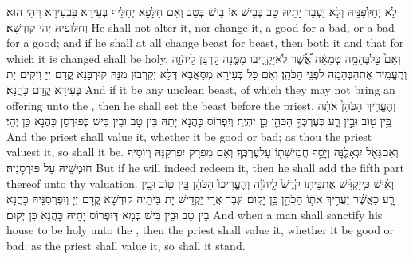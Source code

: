 {לָא יְחַלְּפִנֵּיהּ וְלָא יַעְבַּר יָתֵיהּ טָב בְּבִישׁ אוֹ בִישׁ בְּטָב וְאִם חַלָּפָא יְחַלֵּיף בְּעִירָא בִּבְעִירָא וִיהֵי הוּא וְחִלּוּפֵיהּ יְהֵי קוּדְשָׁא׃}
{He shall not alter it, nor change it, a good for a bad, or a bad for a good; and if he shall at all change beast for beast, then both it and that for which it is changed shall be holy.}{}
{וְאִם֙ כׇּל\maqqaf בְּהֵמָ֣ה טְמֵאָ֔ה אֲ֠שֶׁ֠ר לֹא\maqqaf יַקְרִ֧יבוּ מִמֶּ֛נָּה קׇרְבָּ֖ן לַֽיהֹוָ֑ה וְהֶֽעֱמִ֥יד אֶת\maqqaf הַבְּהֵמָ֖ה לִפְנֵ֥י הַכֹּהֵֽן׃}
{וְאִם כָּל בְּעִירָא מְסָאֲבָא דְּלָא יְקָרְבוּן מִנַּהּ קוּרְבָּנָא קֳדָם יְיָ וִיקִים יָת בְּעִירָא קֳדָם כָּהֲנָא׃}
{And if it be any unclean beast, of which they may not bring an offering unto the \lord, then he shall set the beast before the priest.}{}
{וְהֶעֱרִ֤יךְ הַכֹּהֵן֙ אֹתָ֔הּ בֵּ֥ין ט֖וֹב וּבֵ֣ין רָ֑ע כְּעֶרְכְּךָ֥ הַכֹּהֵ֖ן כֵּ֥ן יִהְיֶֽה׃}
{וְיִפְרוֹס כָּהֲנָא יָתַהּ בֵּין טָב וּבֵין בִּישׁ כְּפוּרְסַן כָּהֲנָא כֵּן יְהֵי׃}
{And the priest shall value it, whether it be good or bad; as thou the priest valuest it, so shall it be.}{}
{וְאִם\maqqaf גָּאֹ֖ל יִגְאָלֶ֑נָּה וְיָסַ֥ף חֲמִישִׁת֖וֹ עַל\maqqaf עֶרְכֶּֽךָ׃}
{וְאִם מִפְרָק יִפְרְקִנַּהּ וְיוֹסֵיף חוּמְשֵׁיהּ עַל פּוּרְסָנֵיהּ׃}
{But if he will indeed redeem it, then he shall add the fifth part thereof unto thy valuation.}{}
{וְאִ֗ישׁ כִּֽי\maqqaf יַקְדִּ֨שׁ אֶת\maqqaf בֵּית֥וֹ קֹ֙דֶשׁ֙ לַֽיהֹוָ֔ה וְהֶעֱרִיכוֹ֙ הַכֹּהֵ֔ן בֵּ֥ין ט֖וֹב וּבֵ֣ין רָ֑ע כַּאֲשֶׁ֨ר יַעֲרִ֥יךְ אֹת֛וֹ הַכֹּהֵ֖ן כֵּ֥ן יָקֽוּם׃}
{וּגְבַר אֲרֵי יַקְדֵּישׁ יָת בֵּיתֵיהּ קוּדְשָׁא קֳדָם יְיָ וְיִפְרְסִנֵּיהּ כָּהֲנָא בֵּין טָב וּבֵין בִּישׁ כְּמָא דְּיִפְרוֹס יָתֵיהּ כָּהֲנָא כֵּן יְקוּם׃}
{And when a man shall sanctify his house to be holy unto the \lord, then the priest shall value it, whether it be good or bad; as the priest shall value it, so shall it stand.}{}
